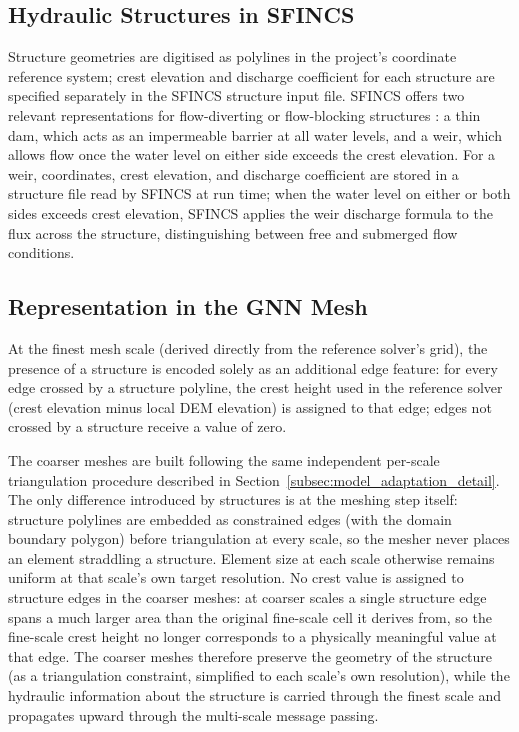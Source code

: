 \documentclass[12pt,a4paper]{report}
\begin{document}
\subsection{Hydraulic Structures in SFINCS}
\label{subsubsec:structures_sfincs}
 
Structure geometries are digitised as polylines in the project's coordinate reference
system; crest elevation and discharge coefficient for each structure are specified
separately in the SFINCS structure input file. SFINCS offers two relevant
representations for flow-diverting or flow-blocking structures \citep{leijnse2021sfincs}:
a thin dam, which acts as an impermeable barrier at all water levels, and a weir, which
allows flow once the water level on either side exceeds the crest elevation. For a weir,
coordinates, crest elevation, and discharge coefficient are stored in a structure file
read by SFINCS at run time; when the water level on either or both sides exceeds crest
elevation, SFINCS applies the weir discharge formula to the flux across the structure,
distinguishing between free and submerged flow conditions.
 
\subsection{Representation in the GNN Mesh}
\label{subsubsec:structures_gnn}
 
At the finest mesh scale (derived directly from the reference solver's grid), the
presence of a structure is encoded solely as an additional edge feature: for every edge
crossed by a structure polyline, the crest height used in the reference solver (crest
elevation minus local DEM elevation) is assigned to that edge; edges not crossed by a
structure receive a value of zero.
 
The coarser meshes are built following the same independent per-scale triangulation
procedure described in Section~\ref{subsec:model_adaptation_detail}. The only difference introduced by structures is at the
meshing step itself: structure polylines are embedded as constrained edges (with the domain boundary polygon) before triangulation at
every scale, so the mesher never places an element straddling a structure. Element size
at each scale otherwise remains uniform at that scale's own target resolution. 
No crest value is assigned to structure edges in the coarser meshes: at coarser scales a single structure edge spans a much larger area than the original fine-scale cell it derives from, so the fine-scale crest height no longer corresponds to a physically meaningful value at that edge. The coarser meshes therefore preserve the geometry of the structure (as a triangulation constraint, simplified to each scale's own resolution), while the hydraulic information about the structure is carried through the finest scale and propagates upward through the multi-scale message passing.
 
\end{document}
